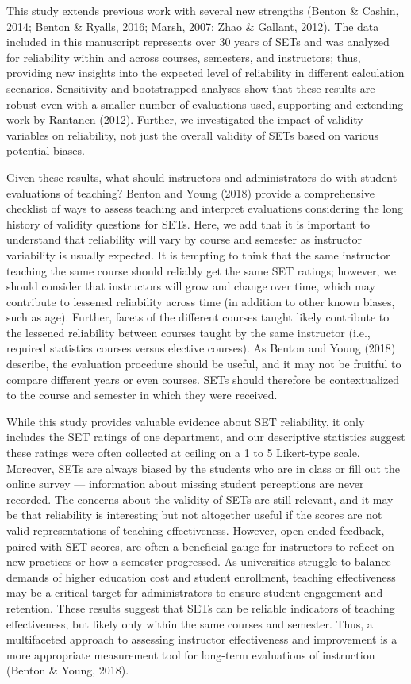\documentclass[
  man]{apa7}
\begin{document}
This study extends previous work with several new strengths (Benton \& Cashin, 2014; Benton \& Ryalls, 2016; Marsh, 2007; Zhao \& Gallant, 2012). The data included in this
manuscript represents over 30 years of SETs and was analyzed for
reliability within and across courses, semesters, and instructors; thus,
providing new insights into the expected level of reliability in
different calculation scenarios. Sensitivity and bootstrapped analyses
show that these results are robust even with a smaller number of
evaluations used, supporting and extending work by Rantanen (2012).
Further, we investigated the impact of validity variables on
reliability, not just the overall validity of SETs based on various
potential biases.

Given these results, what should instructors and administrators do with
student evaluations of teaching? Benton and Young (2018) provide a comprehensive
checklist of ways to assess teaching and interpret evaluations
considering the long history of validity questions for SETs. Here, we
add that it is important to understand that reliability will vary by
course and semester as instructor variability is usually expected. It is
tempting to think that the same instructor teaching the same course
should reliably get the same SET ratings; however, we should consider
that instructors will grow and change over time, which may contribute to
lessened reliability across time (in addition to other known biases,
such as age). Further, facets of the different courses taught likely
contribute to the lessened reliability between courses taught by the
same instructor (i.e., required statistics courses versus elective
courses). As Benton and Young (2018) describe, the evaluation procedure should be
useful, and it may not be fruitful to compare different years or even
courses. SETs should therefore be contextualized to the course and
semester in which they were received.

While this study provides valuable evidence about SET reliability, it
only includes the SET ratings of one department, and our descriptive
statistics suggest these ratings were often collected at ceiling on a 1
to 5 Likert-type scale. Moreover, SETs are always biased by the students
who are in class or fill out the online survey --- information about
missing student perceptions are never recorded. The concerns about the
validity of SETs are still relevant, and it may be that reliability is
interesting but not altogether useful if the scores are not valid
representations of teaching effectiveness. However, open-ended feedback,
paired with SET scores, are often a beneficial gauge for instructors to
reflect on new practices or how a semester progressed. As universities
struggle to balance demands of higher education cost and student
enrollment, teaching effectiveness may be a critical target for
administrators to ensure student engagement and retention. These results
suggest that SETs can be reliable indicators of teaching effectiveness,
but likely only within the same courses and semester. Thus, a
multifaceted approach to assessing instructor effectiveness and
improvement is a more appropriate measurement tool for long-term
evaluations of instruction (Benton \& Young, 2018).
\end{document}
